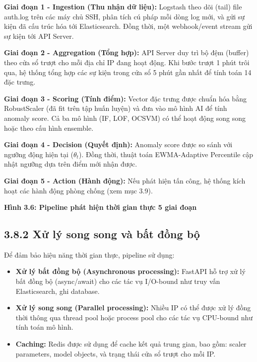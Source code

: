 \documentclass[
  a4paper]{report}
\providecommand{\tightlist}{%
  \setlength{\itemsep}{0pt}\setlength{\parskip}{0pt}}
\begin{document}
\textbf{Giai đoạn 1 - Ingestion (Thu nhận dữ liệu):} Logstash theo dõi
(tail) file auth.log trên các máy chủ SSH, phân tích cú pháp mỗi dòng
log mới, và gửi sự kiện đã cấu trúc hóa tới Elasticsearch. Đồng thời,
một webhook/event stream gửi sự kiện tới API Server.

\textbf{Giai đoạn 2 - Aggregation (Tổng hợp):} API Server duy trì bộ đệm
(buffer) theo cửa sổ trượt cho mỗi địa chỉ IP đang hoạt động. Khi bước
trượt 1 phút trôi qua, hệ thống tổng hợp các sự kiện trong cửa sổ 5 phút
gần nhất để tính toán 14 đặc trưng.

\textbf{Giai đoạn 3 - Scoring (Tính điểm):} Vector đặc trưng được chuẩn
hóa bằng RobustScaler (đã fit trên tập huấn luyện) và đưa vào mô hình AI
để tính anomaly score. Cả ba mô hình (IF, LOF, OCSVM) có thể hoạt động
song song hoặc theo cấu hình ensemble.

\textbf{Giai đoạn 4 - Decision (Quyết định):} Anomaly score được so sánh
với ngưỡng động hiện tại (\(\theta_t\)). Đồng thời, thuật toán
EWMA-Adaptive Percentile cập nhật ngưỡng dựa trên điểm mới nhận được.

\textbf{Giai đoạn 5 - Action (Hành động):} Nếu phát hiện tấn công, hệ
thống kích hoạt các hành động phòng chống (xem mục 3.9).

\textbf{Hình 3.6: Pipeline phát hiện thời gian thực 5 giai đoạn}

\subsection{3.8.2 Xử lý song song và bất đồng
bộ}\label{xux1eed-luxfd-song-song-vuxe0-bux1ea5t-ux111ux1ed3ng-bux1ed9}

Để đảm bảo hiệu năng thời gian thực, pipeline sử dụng:

\begin{itemize}
\tightlist
\item
  \textbf{Xử lý bất đồng bộ (Asynchronous processing):} FastAPI hỗ trợ
  xử lý bất đồng bộ (async/await) cho các tác vụ I/O-bound như truy vấn
  Elasticsearch, ghi database.
\item
  \textbf{Xử lý song song (Parallel processing):} Nhiều IP có thể được
  xử lý đồng thời thông qua thread pool hoặc process pool cho các tác vụ
  CPU-bound như tính toán mô hình.
\item
  \textbf{Caching:} Redis được sử dụng để cache kết quả trung gian, bao
  gồm: scaler parameters, model objects, và trạng thái cửa sổ trượt cho
  mỗi IP.
\end{itemize}
\end{document}
